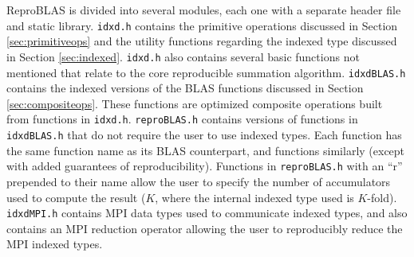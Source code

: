   ReproBLAS is divided into several modules, each one with a separate header file and static library. \texttt{idxd.h} contains the primitive operations discussed in Section \ref{sec:primitiveops} and the utility functions regarding the indexed type discussed in Section \ref{sec:indexed}. \texttt{idxd.h} also contains several basic functions not mentioned that relate to the core reproducible summation algorithm. \texttt{idxdBLAS.h} contains the indexed versions of the BLAS functions discussed in Section \ref{sec:compositeops}. These functions are optimized composite operations built from functions in \texttt{idxd.h}. \texttt{reproBLAS.h} contains versions of functions in \texttt{idxdBLAS.h} that do not require the user to use indexed types. Each function has the same function name as its BLAS counterpart, and functions similarly (except with added guarantees of reproducibility). Functions in \texttt{reproBLAS.h} with an ``r'' prepended to their name allow the user to specify the number of accumulators used to compute the result ($K$, where the internal indexed type used is $K$-fold). \texttt{idxdMPI.h} contains MPI data types used to communicate indexed types, and also contains an MPI reduction operator allowing the user to reproducibly reduce the MPI indexed types.
  
  
